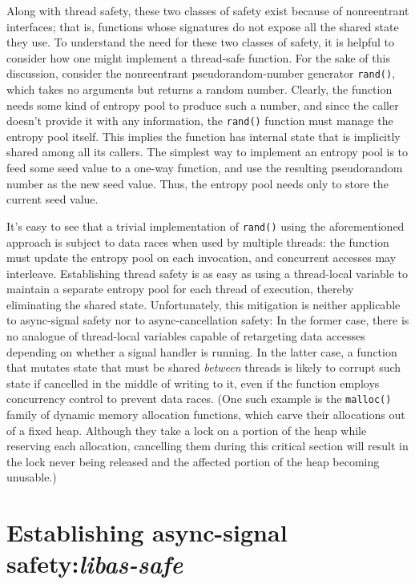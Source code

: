 Along with thread safety, these two classes of safety exist because of nonreentrant
interfaces; that is, functions whose signatures do not expose all the shared state
they use.  To understand the need for these two classes of safety, it is helpful to
consider how one might implement a thread-safe function.  For the sake of this
discussion, consider the nonreentrant pseudorandom-number generator \texttt{rand()},
which takes no arguments but returns a random number.  Clearly, the function needs
some kind of entropy pool to produce such a number, and since the caller doesn't
provide it with any information, the \texttt{rand()} function must manage the entropy
pool itself.  This implies the function has internal state that is implicitly shared
among all its callers.  The simplest way to implement an entropy pool is to feed some
seed value to a one-way function, and use the resulting pseudorandom number as the
new seed value.  Thus, the entropy pool needs only to store the current seed value.

It's easy to see that a trivial implementation of \texttt{rand()} using the
aforementioned approach is subject to data races when used by multiple threads:\@
the function must update the entropy pool on each invocation, and concurrent accesses
may interleave.  Establishing thread safety is as easy as using a thread-local
variable to maintain a separate entropy pool for each thread of execution, thereby
eliminating the shared state.  Unfortunately, this mitigation is neither applicable
to async-signal safety nor to async-cancellation safety:  In the former case, there
is no analogue of thread-local variables capable of retargeting data accesses
depending on whether a signal handler is running.  In the latter case, a function
that mutates state that must be shared \textit{between} threads is likely to corrupt
such state if cancelled in the middle of writing to it, even if the function employs
concurrency control to prevent data races.  (One such example is the
\texttt{malloc()} family of dynamic memory allocation functions, which carve their
allocations out of a fixed heap.  Although they take a lock on a portion of the heap
while reserving each allocation, cancelling them during this critical section will
result in the lock never being released and the affected portion of the heap becoming
unusable.)


\section{Establishing async-signal safety:\@ \textit{libas-safe}}
\label{sec:safety:assafe}

